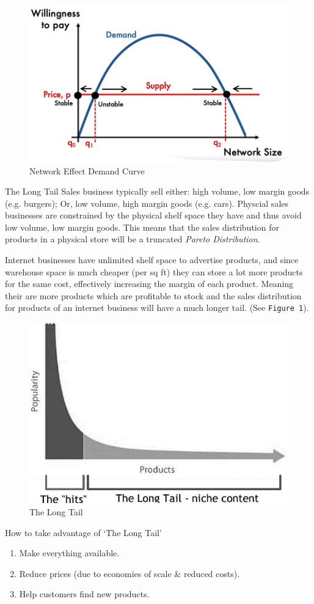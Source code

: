 \documentclass[11pt,a4paper]{article}
\begin{document}
\begin{figure}[ht!]
  \centering
  \includegraphics[width=.5\textwidth]{networkDemandCurve.PNG}
  \caption{Network Effect Demand Curve}
\end{figure}

\begin{proposition}{The Long Tail}
  Sales business typically sell either: high volume, low margin goods (e.g. burgers); Or, low volume, high margin goods (e.g. cars). Physcial sales businesses are constrained by the physical shelf space they have and thus avoid low volume, low margin goods. This means that the sales distribution for products in a physical store will be a truncated \textit{Pareto Distribution}.\\
  \par Internet businesses have unlimited shelf space to advertise products, and since warehouse space is much cheaper (per sq ft) they can store a lot more products for the same cost, effectively increasing the margin of each product. Meaning their are more products which are profitable to stock and the sales distribution for products of an internet business will have a much longer tail. (See \texttt{Figure 1}).
\end{proposition}

\begin{figure}[ht!]
  \centering
  \includegraphics[width=.5\textwidth]{LongTail.jpg}
  \caption{The Long Tail}
\end{figure}

\begin{remark}{How to take advantage of `The Long Tail'}
  \begin{enumerate}
    \item Make everything available.
    \item Reduce prices (due to economies of scale \& reduced costs).
    \item Help customers find new products.
  \end{enumerate}
\end{remark}
\end{document}
